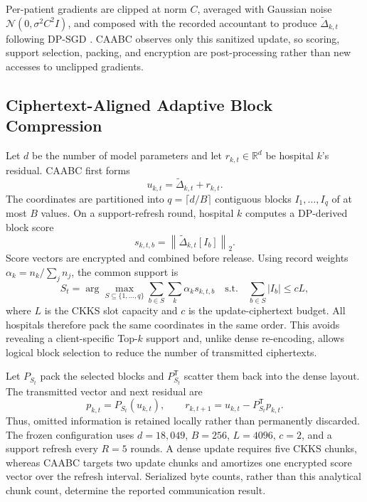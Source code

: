\documentclass[conference]{IEEEtran}
\begin{document}
Per-patient gradients are clipped at norm $C$, averaged with Gaussian noise
$\mathcal{N}(0,\sigma^2C^2I)$, and composed with the recorded accountant to
produce $\widetilde{\Delta}_{k,t}$ following DP-SGD \cite{abadi2016deep}. CAABC
observes only this sanitized update, so scoring, support selection, packing, and
encryption are post-processing rather than new accesses to unclipped gradients.

\subsection{Ciphertext-Aligned Adaptive Block Compression}

Let $d$ be the number of model parameters and let $r_{k,t}\in\mathbb{R}^d$ be
hospital $k$'s residual. CAABC first forms
\begin{equation}
u_{k,t}=\widetilde{\Delta}_{k,t}+r_{k,t}.
\label{eq:paper-effective-update}
\end{equation}
The coordinates are partitioned into $q=\lceil d/B\rceil$ contiguous blocks
$I_1,\ldots,I_q$ of at most $B$ values. On a support-refresh round, hospital
$k$ computes a DP-derived block score
\begin{equation}
s_{k,t,b}=\left\lVert\widetilde{\Delta}_{k,t}[I_b]\right\rVert_2.
\label{eq:paper-block-score}
\end{equation}
Score vectors are encrypted and combined before release. Using record weights
$\alpha_k=n_k/\sum_j n_j$, the common support is
\begin{equation}
S_t=\arg\max_{S\subseteq\{1,\ldots,q\}}
\sum_{b\in S}\sum_k\alpha_k s_{k,t,b}
\quad\text{s.t.}\quad
\sum_{b\in S}|I_b|\leq cL,
\label{eq:paper-caabc-support}
\end{equation}
where $L$ is the CKKS slot capacity and $c$ is the update-ciphertext budget.
All hospitals therefore pack the same coordinates in the same order. This avoids
revealing a client-specific Top-$k$ support and, unlike dense re-encoding,
allows logical block selection to reduce the number of transmitted ciphertexts.

Let $P_{S_t}$ pack the selected blocks and $P_{S_t}^{\mathsf T}$ scatter them
back into the dense layout. The transmitted vector and next residual are
\begin{equation}
p_{k,t}=P_{S_t}(u_{k,t}),\qquad
r_{k,t+1}=u_{k,t}-P_{S_t}^{\mathsf T}p_{k,t}.
\label{eq:paper-error-feedback}
\end{equation}
Thus, omitted information is retained locally rather than permanently discarded.
The frozen configuration uses $d=18{,}049$, $B=256$, $L=4096$, $c=2$, and a
support refresh every $R=5$ rounds. A dense update requires five CKKS chunks,
whereas CAABC targets two update chunks and amortizes one encrypted score vector
over the refresh interval. Serialized byte counts, rather than this analytical
chunk count, determine the reported communication result.
\end{document}
